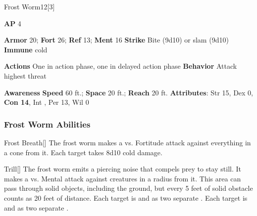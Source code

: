 \begin{monsection}{Frost Worm}{12}[3]
\vspace{-1em}\vspace{-1em}
\begin{spellcontent}
\begin{spelltargetinginfo}
{\textbf{AP} 4}

\pari \textbf{Armor} 20;
\textbf{Fort} 26;
\textbf{Ref} 13;
\textbf{Ment} 16
\pari \textbf{Strike} Bite  (9d10) or slam  (9d10)
\pari \textbf{Immune} cold

\pari \textbf{Actions} One in action phase, one in delayed action phase
\pari \textbf{Behavior} Attack highest threat
\end{spelltargetinginfo}
\end{spellcontent}

\begin{monsterfooter}
\pari \textbf{Awareness} 
\pari \textbf{Speed} 60 ft.;
\textbf{Space} 20 ft.;
\textbf{Reach} 20 ft.
\pari \textbf{Attributes}:
Str 15,
Dex 0,
\textbf{Con 14},
Int ,
Per 13,
Wil 0
\end{monsterfooter}
\end{monsection}


\subsubsection{Frost Worm Abilities}

\begin{freeability}{Frost Breath}[]
The frost worm makes a  vs. Fortitude attack against everything in a \arealarge cone from it.
\hit Each target takes 8d10 cold damage.
\end{freeability}

\vspace{0.5em}
\begin{apability}{Trill}[]
The frost worm emits a piercing noise that compels prey to stay still.
It makes a  vs. Mental attack against creatures in a \areahuge radius from it.
This area can pass through solid objects, including the ground, but every 5 feet of solid obstacle counts as 20 feet of distance.
\hit Each target is  and  as two separate .
\crit Each target is  and  as two separate .
\end{apability}

